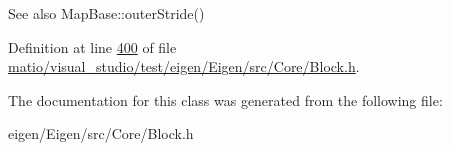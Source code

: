 \begin{DoxySeeAlso}{See also}
Map\+Base\+::outer\+Stride() 
\end{DoxySeeAlso}


Definition at line \hyperlink{matio_2visual__studio_2test_2eigen_2_eigen_2src_2_core_2_block_8h_source_l00400}{400} of file \hyperlink{matio_2visual__studio_2test_2eigen_2_eigen_2src_2_core_2_block_8h_source}{matio/visual\+\_\+studio/test/eigen/\+Eigen/src/\+Core/\+Block.\+h}.



The documentation for this class was generated from the following file\+:\begin{DoxyCompactItemize}
\item 
eigen/\+Eigen/src/\+Core/\+Block.\+h\end{DoxyCompactItemize}
